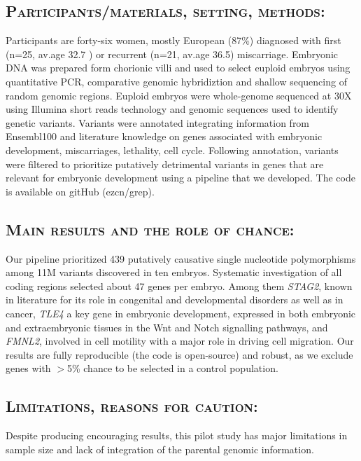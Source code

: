 \subsection*{\textsc{Participants/materials, setting, methods:}} %
Participants are forty-six women, mostly European (87\%) diagnosed with first (n=25, av.age 32.7 ) or recurrent (n=21, av.age 36.5) miscarriage. Embryonic DNA was prepared form chorionic villi and used to select euploid embryos using quantitative PCR, comparative genomic hybridiztion and shallow sequencing of random genomic regions. Euploid embryos were whole-genome sequenced at 30X using Illumina short reads technology and genomic sequences used to identify genetic variants. Variants were annotated integrating information from Ensembl100 and literature knowledge on genes associated with embryonic development, miscarriages, lethality, cell cycle. Following annotation, variants were filtered to prioritize putatively detrimental variants in genes that are relevant for embryonic development using a pipeline that we developed. The code is available on gitHub (ezcn/grep).

\subsection*{\textsc{Main results and the role of chance:}} 
Our pipeline prioritized 439 putatively causative single nucleotide polymorphisms among 11M variants discovered in ten embryos. Systematic investigation of all coding regions selected about 47 genes per embryo. Among them \textit{STAG2}, known in literature for its role in congenital and developmental disorders as well as in cancer, \textit{TLE4} a key gene in embryonic development, expressed in both embryonic and extraembryonic tissues in the Wnt and Notch signalling pathways, and \textit{FMNL2}, involved in cell motility with a major role in driving cell migration. Our results are fully reproducible (the code is open-source) and robust, as we exclude genes with $>$5\% chance to be selected in a control population.  

\subsection*{\textsc{Limitations, reasons for caution:}} 
Despite producing encouraging results, this pilot study has major limitations in sample size and lack of integration of the parental genomic information. %

